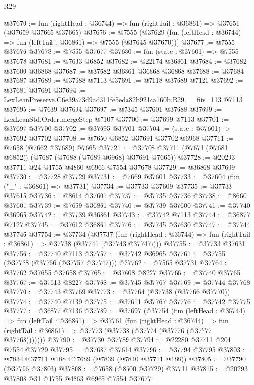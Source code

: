 \begin{lexlean}{R29}
\begin{coremodule}
@37670 := fun (rightHead : @36744) => fun (rightTail : @36861) => @37651 (@37659 @37665 @37665)
@37676 := @7555
    (@37629 (fun (leftHead : @36744) => fun (leftTail : @36861) => @7555 (@37645 @37670)))
@37677 := @7555 @37676
@37678 := @7555 @37677
@37680 := fun (state : @37601) => @7555 @37678
@37681 := @7633 @6852
@37682 := @22174 @36861
@37684 := @37682 @37600 @36868
@37687 := @37682 @36861 @36868 @36868
@37688 := @37684 @37687
@37689 := @37688 @7113
@37691 := @7118 @37689 @7121
@37692 := @37681 @37691
@37694 := LexLeanPreserve.C6e39a73d9ad311fe5eda82b921ca160b.R29.__fits_113 @7113
@37695 := @7639 @37694
@37697 := @7345 @37601 @37688
@37699 := LexLeanStd.Order.mergeStep @7107
@37700 := @37699 @7113
@37701 := @37697 @37700
@37702 := @37695 @37701
@37704 := (state : @37601) -> @37692 @37702
@37708 := @7650 @6852 @37691 @37702 @6968
@37711 := @7658 (@7662 @37689) @7665
@37721 := @37708 @37711 (@7671 (@7681 @6852)) (@7687 (@7688 (@7689 @6968) @37691 @7665))
@37728 := @20293 @37711 @24 @1755 @4860 @6966 @7554 @37678
@37729 := @36868 @37609
@37730 := @37728 @37729
@37731 := @7669 @37601
@37733 := @37604 (fun ("_" : @36861) => @37731)
@37734 := @37733 @37609
@37735 := @37733 @37615
@37736 := @8614 @37601
@37737 := @37735 @37736
@37738 := @8660 @37601
@37739 := @7659 @36861
@37740 := @37739 @37600
@37741 := @37740 @36965
@37742 := @37739 @36861
@37743 := @37742 @7113
@37744 := @36877 @7127
@37745 := @37612 @36861
@37746 := @37745 @37630
@37747 := @37744 @37746
@37754 := @37734
    (@37737
      (fun (rightHead : @36744) => fun (rightTail : @36861) => @37738 (@37741 (@37743 @37747))))
@37755 := @37733 @37631
@37756 := @37740 @7113
@37757 := @37742 @36965
@37761 := @37755 (@37738 (@37756 (@37757 @37747)))
@37762 := @7565 @37731
@37764 := @37762 @37655 @37658
@37765 := @37608 @8227
@37766 := @37740 @37765
@37767 := @37613 @8227
@37768 := @37745 @37767
@37769 := @37744 @37768
@37770 := @37743 @37769
@37773 := @37764 (@37738 (@37766 @37770))
@37774 := @37740 @7139
@37775 := @37611 @37767
@37776 := @37742 @37775
@37777 := @36877 @7136
@37789 := @37697
    (@37754
      (fun (leftHead : @36744) =>
      fun (leftTail : @36861) =>
      @37761
        (fun (rightHead : @36744) =>
        fun (rightTail : @36861) => @37773 (@37738 (@37774 (@37776 (@37777 @37768)))))))
@37790 := @37730 @37789
@37794 := @22280 @37711 @204 @7554 @37729
@37795 := @37687 @37614
@37796 := @37794 @37795
@37803 := @7834 @37711 @188 @37689 (@7839 (@7840 @37711 @188))
@37805 := @37790 (@37796 @37803)
@37808 := @7658 (@8500 @37729) @37711
@37815 := @20293 @37808 @31 @1755 @4863 @6965 @7554 @37677

\end{coremodule}
\end{lexlean}
